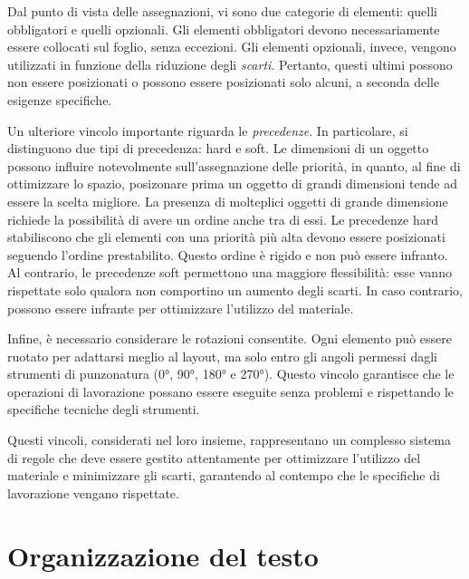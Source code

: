Dal punto di vista delle assegnazioni, vi sono due categorie di elementi: quelli obbligatori e quelli opzionali. Gli elementi obbligatori devono necessariamente essere collocati sul foglio, senza eccezioni. Gli elementi opzionali, invece, vengono utilizzati in funzione della riduzione degli \emph{scarti}\glsfirstoccur. Pertanto, questi ultimi possono non essere posizionati o possono essere posizionati solo alcuni, a seconda delle esigenze specifiche.

Un ulteriore vincolo importante riguarda le \emph{precedenze}\glsfirstoccur. In particolare, si distinguono due tipi di precedenza: hard e soft. Le dimensioni di un oggetto possono influire notevolmente sull'assegnazione delle priorità, in quanto, al fine di ottimizzare lo spazio, posizonare prima un oggetto di grandi dimensioni tende ad essere la scelta migliore. La presenza di molteplici oggetti di grande dimensione richiede la possibilità di avere un ordine anche tra di essi. Le precedenze hard stabiliscono che gli elementi con una priorità più alta devono essere posizionati seguendo l'ordine prestabilito. Questo ordine è rigido e non può essere infranto. Al contrario, le precedenze soft permettono una maggiore flessibilità: esse vanno rispettate solo qualora non comportino un aumento degli scarti. In caso contrario, possono essere infrante per ottimizzare l’utilizzo del materiale.

Infine, è necessario considerare le rotazioni consentite. Ogni elemento può essere ruotato per adattarsi meglio al layout, ma solo entro gli angoli permessi dagli strumenti di punzonatura (0°, 90°, 180° e 270°). Questo vincolo garantisce che le operazioni di lavorazione possano essere eseguite senza problemi e rispettando le specifiche tecniche degli strumenti.

Questi vincoli, considerati nel loro insieme, rappresentano un complesso sistema di regole che deve essere gestito attentamente per ottimizzare l’utilizzo del materiale e minimizzare gli scarti, garantendo al contempo che le specifiche di lavorazione vengano rispettate.

\section{Organizzazione del testo}

